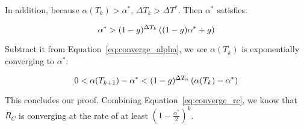 In addition, because $\alpha ({T_k}) > {\alpha ^*}$, $\Delta {T_k} > \Delta {T^*}$. 
Then $\alpha^{*}$ satisfies:

\begin{equation}
\small
{\alpha ^*} > {(1 - g)^{\Delta {T_k}}}\left( {(1 - g){\alpha ^*} + g} \right)
\end{equation}

Subtract it from Equation~\ref{eq:converge_alpha}, we see $\alpha ({T_k})$ is exponentially 
converging to $\alpha ^*$:

\begin{equation}
\small
0 < \alpha ({T_{k + 1}}) - {\alpha ^*} < {(1 - g)^{\Delta {T_n}}}\left( {\alpha ({T_k}) - {\alpha ^*}} \right)
\end{equation}

This concludes our proof. Combining Equation~\ref{eq:converge_rc}, we know that $R_C$ is 
converging at the rate of at least $( {1 - \frac{{{\alpha ^{*}}}}{2}} )^k$.

